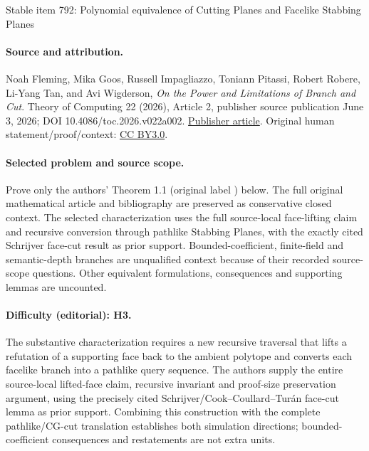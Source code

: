\documentclass[11pt]{article}
\numberwithin{equation}{section}
\theoremstyle{definition}
\theoremstyle{plain}
\newcounter{cor}\renewcommand{\thecor}{1.1.\arabic{cor}}\newenvironment{cor}{\ifnum\value{cor}=0\refstepcounter{cor}\else\PackageError{toc-native-compat}{Unsupported additional cor envelope}{Only the one exact source-observed cor paragraph is allowed.}\fi}{}\providecommand{\corautorefname}{Theorem}
\begin{document}
\begin{center}{\Large Stable item 792: Polynomial equivalence of Cutting Planes and Facelike Stabbing Planes}\end{center}
\paragraph{Source and attribution.}
Noah Fleming, Mika Goos, Russell Impagliazzo, Toniann Pitassi, Robert Robere, Li-Yang Tan, and Avi Wigderson, \emph{On the Power and Limitations of Branch and Cut}. Theory of Computing 22 (2026), Article 2, publisher source publication June 3, 2026; DOI 10.4086/toc.2026.v022a002. \href{https://theoryofcomputing.org/articles/v022a002/}{Publisher article}. Original human statement/proof/context: \href{https://creativecommons.org/licenses/by/3.0/}{CC BY3.0}.
\paragraph{Selected problem and source scope.}
Prove only the authors' Theorem 1.1 (original label ) below. The full original mathematical article and bibliography are preserved as conservative closed context. The selected characterization uses the full source-local face-lifting claim and recursive conversion through pathlike Stabbing Planes, with the exactly cited Schrijver face-cut result as prior support. Bounded-coefficient, finite-field and semantic-depth branches are unqualified context because of their recorded source-scope questions. Other equivalent formulations, consequences and supporting lemmas are uncounted.
\paragraph{Difficulty (editorial): H3.}
The substantive characterization requires a new recursive traversal that lifts a refutation of a supporting face back to the ambient polytope and converts each facelike branch into a pathlike query sequence. The authors supply the entire source-local lifted-face claim, recursive invariant and proof-size preservation argument, using the precisely cited Schrijver/Cook–Coullard–Turán face-cut lemma as prior support. Combining this construction with the complete pathlike/CG-cut translation establishes both simulation directions; bounded-coefficient consequences and restatements are not extra units.
\end{document}
